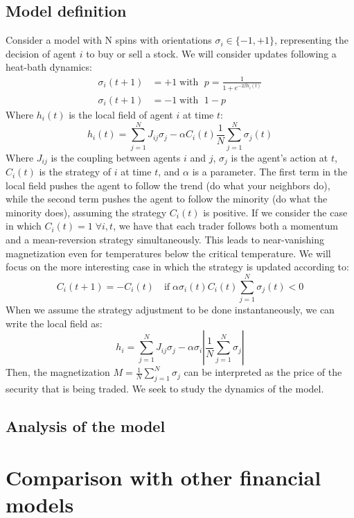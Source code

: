 \subsection{Model definition}
Consider a model with N spins with orientations $\sigma_i\in\{-1,+1\}$, representing the decision of agent $i$ to buy or sell a stock. We will consider updates following a heat-bath dynamics:
\begin{equation}
    \begin{aligned}
        \sigma_i(t+1) &= +1 \;\text{with }\; p = \frac{1}{1+e^{-2\beta h_i(t)}}\\
        \sigma_i(t+1) &= -1 \;\text{with }\; 1-p
    \end{aligned}
\end{equation}
Where $h_i(t)$ is the local field of agent $i$ at time $t$:
\begin{equation}
    h_i(t)=\sum_{j=1}^N J_{i j} \sigma_j-\alpha C_i(t) \frac{1}{N} \sum_{j=1}^N \sigma_j(t)
\end{equation}
Where $J_{i j}$ is the coupling between agents $i$ and $j$, $\sigma_j$ is the agent's action at $t$, $C_i(t)$ is the strategy of $i$ at time $t$, and $\alpha$ is a parameter. The first term in the local field pushes the agent to follow the trend (do what your neighbors do), while the second term pushes the agent to follow the minority (do what the minority does), assuming the strategy $C_i(t)$ is positive. 
If we consider the case in which $C_i(t) = 1\;\forall i, t$, we have that each trader follows both a momentum and a mean-reversion strategy simultaneously. This leads to near-vanishing magnetization even for temperatures below the critical temperature. We will focus on the more interesting case in which the strategy is updated according to:
\begin{equation}
    C_i(t+1) = -C_i(t) \quad\text{if} \; \alpha\sigma_i(t)C_i(t) \sum_{j=1}^N \sigma_j(t)< 0
\end{equation}
When we assume the strategy adjustment to be done instantaneously, we can write the local field as:
\begin{equation}
    h_i=\sum_{j=1}^N J_{i j} \sigma_j-\alpha \sigma_i \left | \frac{1}{N}\sum_{j=1}^N \sigma_j \right |
\end{equation}
Then, the magnetization \(M = \frac{1}{N}\sum_{j=1}^N \sigma_j\) can be interpreted as the price of the security that is being traded. We seek to study the dynamics of the model.

\subsection{Analysis of the model}

\section{Comparison with other financial models}
